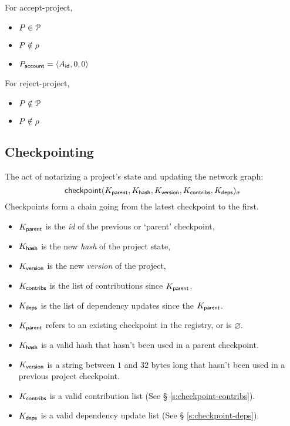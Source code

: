 \bigskip
\noindent For \textsf{accept-project},
\newline\outputs
\begin{itemize}
    \item $P \in \mathcal{P}$
    \item $P \notin \mathcal{\rho}$
    \item $P_{\mathsf{account}} = \langle A_{\mathsf{id}}, 0, 0\rangle$
\end{itemize}
\bigskip
\noindent For \textsf{reject-project},
\newline\outputs
\begin{itemize}
    \item $P \notin \mathcal{P}$
    \item $P \notin \mathcal{\rho}$
\end{itemize}

\subsection{Checkpointing}
\label{s:checkpoint}
The act of notarizing a project's state and updating the network graph:
\[
    \operatorname{\mathsf{checkpoint}}\lparen K_{\mathsf{parent}}, K_{\mathsf{hash}}, K_{\mathsf{version}},
    K_{\mathsf{contribs}}, K_{\mathsf{deps}}\rparen_\sigma
\]
Checkpoints form a chain going from the latest checkpoint to the first.

\begin{itemize}
    \item $K_{\mathsf{parent}}$ is the \emph{id} of the previous or `parent' checkpoint,
    \item $K_{\mathsf{hash}}$ is the new \emph{hash} of the project state,
    \item $K_{\mathsf{version}}$ is the new \emph{version} of the project,
    \item $K_{\mathsf{contribs}}$ is the list of contributions since $K_{\mathsf{parent}}$,
    \item $K_{\mathsf{deps}}$ is the list of dependency updates since the $K_{\mathsf{parent}}$.
\end{itemize}
\validation
\begin{itemize}
    \item{$K_{\mathsf{parent}}$ refers to an existing checkpoint in the registry,
        or is $\varnothing$.}
    \item{$K_{\mathsf{hash}}$ is a valid hash that hasn't been used in a parent
        checkpoint.}
    \item{$K_{\mathsf{version}}$ is a string between $1$ and $32$ bytes long that
        hasn't been used in a previous project checkpoint.}
    \item{$K_{\mathsf{contribs}}$ is a valid contribution list (See \S
        \ref{s:checkpoint-contribs}).}
    \item{$K_{\mathsf{deps}}$ is a valid dependency update list (See \S
        \ref{s:checkpoint-deps}).}
\end{itemize}

